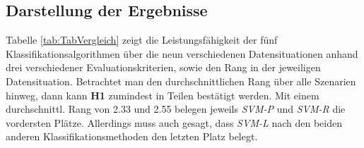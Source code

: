 \documentclass[
]{article}
\begin{document}
\subsection{Darstellung der Ergebnisse}

Tabelle \ref{tab:TabVergleich} zeigt die Leistungsfähigkeit der fünf
Klassifikationsalgorithmen über die neun verschiedenen Datensituationen
anhand drei verschiedener Evaluationskriterien, sowie den Rang in der
jeweiligen Datensituation. Betrachtet man den durchschnittlichen Rang
über alle Szenarien hinweg, dann kann \textbf{H1} zumindest in Teilen
bestätigt werden. Mit einem durchschnittl. Rang von 2.33 und 2.55
belegen jeweils \textit{SVM-P} und \textit{SVM-R} die vordersten Plätze.
Allerdings muss auch gesagt, dass \textit{SVM-L} nach den beiden anderen
Klassifikationsmethoden den letzten Platz belegt.\newline \afterpage{
\clearpage
\begin{landscape}


\end{landscape}}
\end{document}

